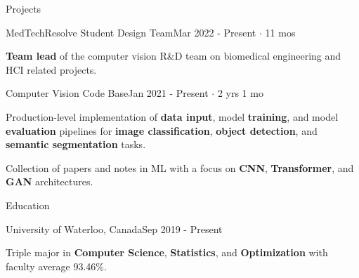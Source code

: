 \documentclass{resume}
\begin{document}
\begin{rSection}{Projects}

    \begin{rSubsection}{MedTechResolve Student Design Team}{Mar 2022 - Present \(\cdot\) 11 mos}{}{}
        \item \textbf{Team lead} of the computer vision R\&D team on biomedical engineering and HCI related projects.
    \end{rSubsection}

    \begin{rSubsection}{Computer Vision Code Base}{Jan 2021 - Present \(\cdot\) 2 yrs 1 mo}{}{}
        \item \href{https://github.com/danielmao2019/Computer-Vision-TensorFlow}{\faGithub}
        Production-level implementation of \textbf{data input}, model \textbf{training}, and model \textbf{evaluation} pipelines for
        \textbf{image classification}, \textbf{object detection}, and \textbf{semantic segmentation} tasks.
        \item \href{https://github.com/danielmao2019/Machine-Learning-Knowledge-Base}{\faGithub}
        Collection of papers and notes in ML with a focus on \textbf{CNN}, \textbf{Transformer}, and \textbf{GAN} architectures.
    \end{rSubsection}

\end{rSection}

\begin{rSection}{Education}

    \begin{rSubsection}{University of Waterloo, Canada}{Sep 2019 - Present}{}{}
        \item Triple major in \textbf{Computer Science}, \textbf{Statistics}, and \textbf{Optimization} with faculty average 93.46\%.
    \end{rSubsection}

\end{rSection}
\end{document}
